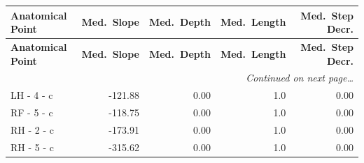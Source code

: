 \documentclass[a4paper,11pt]{article}
\begin{document}
\begin{small}
\begin{longtable}{p{4.5cm}rrrr}
\toprule
\textbf{Anatomical Point} &
\textbf{Med.\ Slope} &
\textbf{Med.\ Depth} &
\textbf{Med.\ Length} &
\textbf{Med.\ Step Decr.} \\
\midrule
\endfirsthead
\toprule
\textbf{Anatomical Point} &
\textbf{Med.\ Slope} &
\textbf{Med.\ Depth} &
\textbf{Med.\ Length} &
\textbf{Med.\ Step Decr.} \\
\midrule
\endhead
\midrule
\multicolumn{5}{r}{\small\emph{Continued on next page\ldots}} \\
\endfoot
\bottomrule
\endlastfoot
LH - 4 - c & -121.88 & 0.00 & 1.0 & 0.00 \\
RF - 5 - c & -118.75 & 0.00 & 1.0 & 0.00 \\
RH - 2 - c & -173.91 & 0.00 & 1.0 & 0.00 \\
RH - 5 - c & -315.62 & 0.00 & 1.0 & 0.00 \\
\end{longtable}
\end{small}
\end{document}
